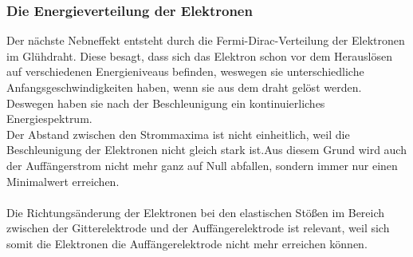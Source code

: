 \subsubsection{Die Energieverteilung der Elektronen}
\label{subsubsec:Energieverteilung}
Der nächste Nebneffekt entsteht durch die Fermi-Dirac-Verteilung der Elektronen im Glühdraht. Diese besagt, dass sich das Elektron schon vor dem
Herauslösen auf verschiedenen Energieniveaus befinden, weswegen sie unterschiedliche Anfangsgeschwindigkeiten haben, wenn sie aus dem draht gelöst werden.
Deswegen haben sie nach der Beschleunigung ein kontinuierliches Energiespektrum.\\
Der Abstand zwischen den Strommaxima ist nicht einheitlich, weil die Beschleunigung der Elektronen nicht gleich stark ist.Aus diesem Grund wird auch der Auffängerstrom nicht mehr
ganz auf Null abfallen, sondern immer nur einen Minimalwert erreichen.\\
\\
Die Richtungsänderung der Elektronen bei den elastischen Stößen im Bereich zwischen der Gitterelektrode und der Auffängerelektrode ist relevant,
weil sich somit die Elektronen die Auffängerelektrode nicht mehr erreichen können.

